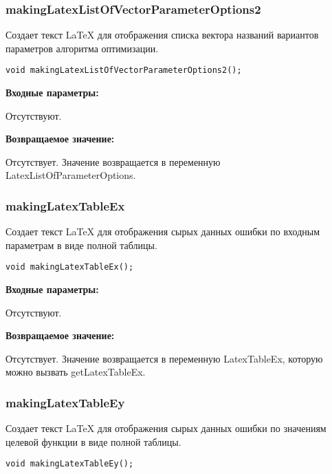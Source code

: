 \documentclass[a4paper,12pt]{article}
\begin{document}
\subsubsection{makingLatexListOfVectorParameterOptions2}\label{makingLatexListOfVectorParameterOptions2}

Создает текст LaTeX для отображения списка вектора названий вариантов параметров алгоритма оптимизации.


\begin{lstlisting}[label=code_syntax_makingLatexListOfVectorParameterOptions2,caption=Синтаксис]
void makingLatexListOfVectorParameterOptions2();
\end{lstlisting}

\textbf{Входные параметры:}

Отсутствуют.

\textbf{Возвращаемое значение:}

Отсутствует. Значение возвращается в переменную LatexListOfParameterOptions.


\subsubsection{makingLatexTableEx}\label{makingLatexTableEx}

Создает текст LaTeX для отображения сырых данных ошибки по входным параметрам в виде полной таблицы.


\begin{lstlisting}[label=code_syntax_makingLatexTableEx,caption=Синтаксис]
void makingLatexTableEx();
\end{lstlisting}

\textbf{Входные параметры:}

Отсутствуют.

\textbf{Возвращаемое значение:}

Отсутствует. Значение возвращается в переменную LatexTableEx, которую можно вызвать getLatexTableEx.


\subsubsection{makingLatexTableEy}\label{makingLatexTableEy}

Создает текст LaTeX для отображения сырых данных ошибки по значениям целевой функции в виде полной таблицы.


\begin{lstlisting}[label=code_syntax_makingLatexTableEy,caption=Синтаксис]
void makingLatexTableEy();
\end{lstlisting}
\end{document}
